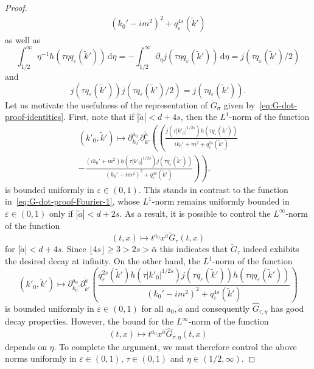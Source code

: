 \documentclass{article}
\numberwithin{equation}{section}
\newcommand{\mathd}{\mathrm{d}}
\theoremstyle{plain}
\theoremstyle{definition}
\begin{document}
\begin{proof}
\begin{align*}
     {(k_0' - i m^2)^2 + q^{4 s}_{\varepsilon}(\tilde{k}')}
  \end{align*}
  as well as
  \[ \int^{\infty}_{1 / 2} \eta^{- 1} h (\tau \eta q _{\varepsilon}
     (\tilde{k}'))\,\mathd \eta = - \int^{\infty}_{1 / 2} \partial_{\eta} j
     (\tau \eta q _{\varepsilon} (\tilde{k}'))\,\mathd \eta = j (\tau q
     _{\varepsilon} (\tilde{k}') / 2) \]
  and
  \[ j (\tau q _{\varepsilon} (\tilde{k}')) j (\tau q _{\varepsilon}
     (\tilde{k}') / 2) = j (\tau q _{\varepsilon} (\tilde{k}')) . \]
  Let us motivate the usefulness of the representation of $\dot{G}_{\sigma}$
  given by~\eqref{eq:G-dot-proof-identities}. First, note that if $| \tilde{a}
  | < d + 4 s$, then the $L^1$-norm of the function
  \begin{align*}
    (k'_0, \tilde{k}') \mapsto
    \partial_{k_0'}^{a_0}
    \partial_{\tilde{k}'}^{\tilde{a}}
    \left( \left(
    \frac{j \left( \tau | k'_0 |^{1 / 2 s} \right)
    h(\tau q _{\varepsilon}(\tilde{k}'))}
    {i k_0' + m^2 + q^{2 s}_{\varepsilon}(\tilde{k}')}\right.\right.\\
    \left.\left.
    - \frac{(i k_0' + m^2)
    h \left( \tau | k'_0 |^{1 / 2 s} \right)
    j(\tau q _{\varepsilon}(\tilde{k}'))}
    {(k_0' - i m^2)^2 + q^{4 s}_{\varepsilon}(\tilde{k}')}
    \right)  \right),
  \end{align*}
  is bounded uniformly in $\varepsilon \in (0, 1)$. This stands in contrast to
  the function in~\eqref{eq:G-dot-proof-Fourier-1}, whose $L^1$-norm remains
  uniformly bounded in $\varepsilon \in (0, 1)$ only if $| \tilde{a} | < d + 2
  s$. As a result, it is possible to control the $L^{\infty}$-norm of the
  function
  \[ (t, x) \mapsto t^{a_0} x^{\tilde{a}} \check{G}_{\tau} (t, x)
  \]
  for $| \tilde{a} | < d + 4 s$. Since $\lfloor 4 s \rfloor \geqslant 3 > 2 s
  > \bar\alpha$ this indicates that $\check{G}_{\tau}$ indeed exhibits
  the desired decay at infinity. On the other hand, the $L^1$-norm of the
  function
  \[ (k'_0, \tilde{k}') \mapsto \partial_{k_0'}^{a_0}
     \partial_{\tilde{k}'}^{\tilde{a}} \left( \frac{q^{2 s}_{\varepsilon}
     (\tilde{k}') h \left( \tau  | k'_0 |^{1 / 2 s}  \right) j
     (\tau^{} q _{\varepsilon} (\tilde{k}') ) h (\tau  \eta  q _{\varepsilon}
     (\tilde{k}'))}{(k_0' - i m^2)^2 + q^{4 s}_{\varepsilon} (\tilde{k}')}
      \right) \]
  is bounded uniformly in $\varepsilon \in (0, 1)$ for all $a_0, \tilde{a}$
  and consequently $\hat{G}_{\tau, \eta}$ has good decay
  properties. However, the bound for the $L^{\infty}$-norm of the function
  \[ (t, x) \mapsto t^{a_0} x^{\tilde{a}} \hat{G}_{\tau, \eta} (t,
     x) \]
  depends on $\eta$. To complete the argument, we must therefore control the
  above norms uniformly in $\varepsilon \in (0, 1)$, $\tau \in (0, 1)$ and
  $\eta \in (1 / 2, \infty)$.
  

\end{proof}
\end{document}
